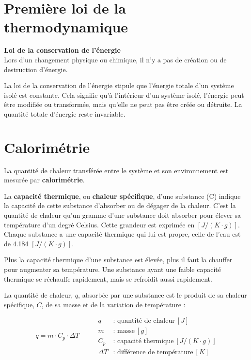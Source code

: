 \documentclass[
  11pt,
  a4paper,
  openany]{book}
\begin{document}
\section{Première loi de la thermodynamique}\label{premiuxe8re-loi-de-la-thermodynamique}

\begin{tcolorbox}
\textbf{Loi de la conservation de l'énergie}\\
Lors d'un changement physique ou chimique, il n'y a pas de création ou de destruction d'énergie.

\end{tcolorbox}

La loi de la conservation de l'énergie stipule que l'énergie totale d'un système isolé est constante. Cela signifie qu'à l'intérieur d'un système isolé, l'énergie peut être modifiée ou transformée, mais qu'elle ne peut pas être créée ou détruite. La quantité totale d'énergie reste invariable.

\section{Calorimétrie}\label{calorimuxe9trie}

La quantité de chaleur transférée entre le système et son environnement est mesurée par \textbf{calorimétrie}.

La \textbf{capacité thermique}, ou \textbf{chaleur spécifique}, d'une substance (C) indique la capacité de cette substance d'absorber ou de dégager de la chaleur. C'est la quantité de chaleur qu'un gramme d'une substance doit absorber pour élever sa température d'un degré Celsius. Cette grandeur est exprimée en \([J/(K \cdot g)]\). Chaque substance a une capacité thermique qui lui est propre, celle de l'eau est de 4.184 \([J/(K \cdot g)]\).

Plus la capacité thermique d'une substance est élevée, plus il faut la chauffer pour augmenter sa température. Une substance ayant une faible capacité thermique se réchauffe rapidement, mais se refroidit aussi rapidement.

La quantité de chaleur, \(q\), absorbée par une substance est le produit de sa chaleur spécifique, \(C\), de sa masse et de la variation de température :

\[
\begin{split}
q = m \cdot C_p \cdot \Delta T
\end{split}
\qquad
\begin{split}
q & \text{: quantité de chaleur}\ [J] \\
m & \text{: masse}\ [g] \\
C_p & \text{: capacité thermique}\ [J/(K \cdot g)] \\
\Delta T & \text{: différence de température}\ [K]
\end{split}
\]
\end{document}
